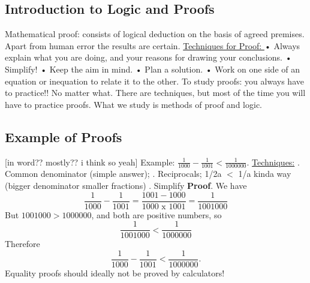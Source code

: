 \documentclass{article}
\begin{document}
\subsection{Introduction to Logic and Proofs}
Mathematical proof: consists of logical deduction on the basis of agreed premises. Apart from human error the results are certain.
\newline
\newline
\underline{ Techniques for Proof: }
\newline
\newline
•	Always explain what you are doing, and your reasons for drawing your conclusions.
\newline
•	Simplify!
\newline
•	Keep the aim in mind.
\newline
•	Plan a solution. 
\newline
• Work on one side of an equation or inequation to relate it to the other.
\newline
\newline
To study proofs: you always have to practice!! No matter what. There are techniques,
but most of the time you will have to practice proofs.
\newline
What we study is methods of proof and logic.
\newpage
\subsection{Example of Proofs}
[in word?? mostly?? i think so yeah]
\newline
\newline
Example: $\frac{1}{1000} - \frac{1}{1001} < \frac{1}{1000000}.$
\newline
\underline{Techniques:} 
. Common denominator (simple answer); 
. Reciprocals; 1/2a $<$ 1/a kinda way (bigger denominator smaller fractions)
. Simplify
\newline
\newline
\textbf{Proof}. We have
$$\frac{1}{1000} - \frac{1}{1001} = \frac{1001 - 1000}{1000 \text{ x } 1001} = \frac{1}{1001000}$$
But $1001000 > 1000000$, and both are positive numbers, so
$$\frac{1}{1001000} < \frac{1}{1000000}$$  
Therefore
$$\frac{1}{1000} - \frac{1}{1001} < \frac{1}{1000000}.$$  
\newline
{}
\newline
\newline
Equality proofs should ideally not be proved by calculators!
\newpage
\end{document}
